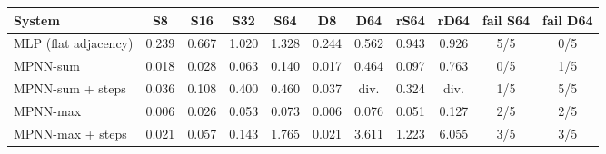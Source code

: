 \begin{tabular}{lcccccccccc}\toprule
 System & S8 & S16 & S32 & S64 & D8 & D64 & rS64 & rD64 & fail S64 & fail D64 \\\midrule
MLP (flat adjacency) & 0.239 & 0.667 & 1.020 & 1.328 & 0.244 & 0.562 & 0.943 & 0.926 & 5/5 & 0/5 \\
MPNN-sum & 0.018 & 0.028 & 0.063 & 0.140 & 0.017 & 0.464 & 0.097 & 0.763 & 0/5 & 1/5 \\
MPNN-sum + steps & 0.036 & 0.108 & 0.400 & 0.460 & 0.037 & div. & 0.324 & div. & 1/5 & 5/5 \\
MPNN-max & 0.006 & 0.026 & 0.053 & 0.073 & 0.006 & 0.076 & 0.051 & 0.127 & 2/5 & 2/5 \\
MPNN-max + steps & 0.021 & 0.057 & 0.143 & 1.765 & 0.021 & 3.611 & 1.223 & 6.055 & 3/5 & 3/5 \\
\bottomrule\end{tabular}
